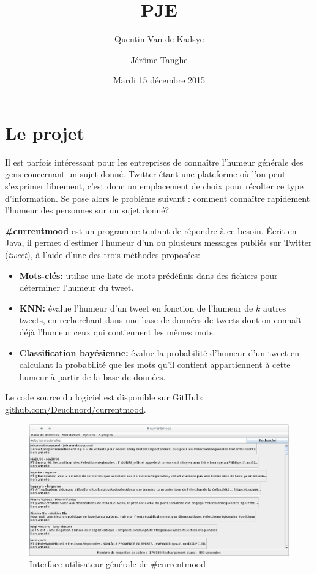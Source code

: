 \documentclass[12pt,a4paper]{report}
\title{PJE\\\CMName}
\author{Quentin Van de Kadsye \and Jérôme Tanghe}
\date{Mardi 15 décembre 2015}
\newcommand{\CMName}{\#currentmood}
\begin{document}
\maketitle

\tableofcontents


\chapter{Le projet}

Il est parfois intéressant pour les entreprises de connaître l'humeur générale
des gens concernant un sujet donné. Twitter étant une plateforme où l'on peut
s'exprimer librement, c'est donc un emplacement de choix pour récolter ce type
d'information. Se pose alors le problème suivant : comment connaître rapidement
l'humeur des personnes sur un sujet donné?

\textbf{\CMName} est un programme tentant de répondre à ce besoin. Écrit
en Java, il permet d'estimer l'humeur d'un ou plusieurs messages publiés sur
Twitter (\textit{tweet}), à l'aide d'une des trois méthodes proposées:

\begin{itemize}
	\item
		\textbf{Mots-clés:} utilise une liste de mots prédéfinis dans des
		fichiers pour déterminer l'humeur du tweet.
	\item
		\textbf{KNN:} évalue l'humeur d'un tweet en fonction de l'humeur de $k$
		autres tweets, en recherchant dans une base de données de tweets dont on
		connaît déjà l'humeur ceux qui contiennent les mêmes mots.
	\item
		\textbf{Classification bayésienne:} évalue la probabilité d'humeur d'un
		tweet en calculant la probabilité que les mots qu'il contient
		appartiennent à cette humeur à partir de la base de données.
\end{itemize}

Le code source du logiciel est disponible sur GitHub:
\href{http://github.com/Deuchnord/currentmood}{github.com/Deuchnord/currentmood}.

\begin{figure}
	\includegraphics[width=\textwidth]{img/capture-currentmood-ui.png}
	\caption{Interface utilisateur générale de \CMName}
	\label{cm_ui}
\end{figure}
\end{document}
